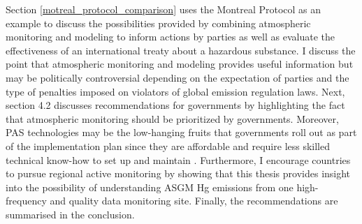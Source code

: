 \begin{flushleft}
    Section \ref{motreal_protocol_comparison} uses the Montreal Protocol as an example to discuss the possibilities provided by combining atmospheric monitoring and modeling to inform actions by parties as well as evaluate the effectiveness of an international treaty about a hazardous substance. I discuss the point that atmospheric monitoring and modeling provides useful information but may be politically controversial depending on the expectation of parties and the type of penalties imposed on violators of global emission regulation laws. Next, section 4.2 discusses recommendations for governments by highlighting the fact that atmospheric monitoring should be prioritized by governments. Moreover, PAS technologies may be the low-hanging fruits that governments roll out as part of the implementation plan since they are affordable and require less skilled technical know-how to set up and maintain \cite{quant_measuring_2021}. Furthermore, I encourage countries to pursue regional active monitoring  by showing that this thesis provides insight into the possibility of understanding ASGM Hg emissions from one high-frequency and quality data monitoring site. Finally, the recommendations are summarised in the conclusion. 
\end{flushleft}
